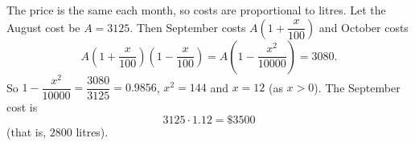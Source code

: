 The price is the same each month, so costs are proportional to litres. Let the August cost be $A=3125$. Then September costs $A\left(1+\dfrac{x}{100}\right)$ and October costs
\[
A\left(1+\dfrac{x}{100}\right)\left(1-\dfrac{x}{100}\right)=A\left(1-\dfrac{x^2}{10000}\right)=3080 .
\]
So $1-\dfrac{x^2}{10000}=\dfrac{3080}{3125}=0.9856$, $x^2=144$ and $x=12$ (as $x>0$). The September cost is
\[
3125\cdot1.12=\boxed{\$3500}
\]
(that is, $2800$ litres).
